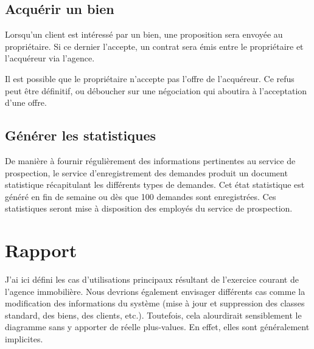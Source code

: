 \subsection{Acquérir un bien}

Lorsqu'un client est intéressé par un bien, une proposition sera envoyée au propriétaire. Si ce dernier l'accepte, un contrat sera émis entre le propriétaire et l'acquéreur via l'agence.

Il est possible que le propriétaire n'accepte pas l'offre de l'acquéreur. Ce refus peut être définitif, ou déboucher sur une négociation qui aboutira à l'acceptation d'une offre.

\subsection{Générer les statistiques}

De manière à fournir régulièrement des informations pertinentes au service de prospection, le service d'enregistrement des demandes produit un document statistique récapitulant les différents types de demandes. Cet état statistique est généré en fin de semaine ou dès que 100 demandes sont enregistrées. Ces statistiques seront mise à disposition des employés du service de prospection.

\section{Rapport}

J'ai ici défini les cas d'utilisations principaux résultant de l'exercice courant de l'agence immobilière. Nous devrions également envisager différents cas comme la modification des informations du système (mise à jour et suppression des classes standard, des biens, des clients, etc.). Toutefois, cela alourdirait sensiblement le diagramme sans y apporter de réelle plus-values. En effet, elles sont généralement implicites.